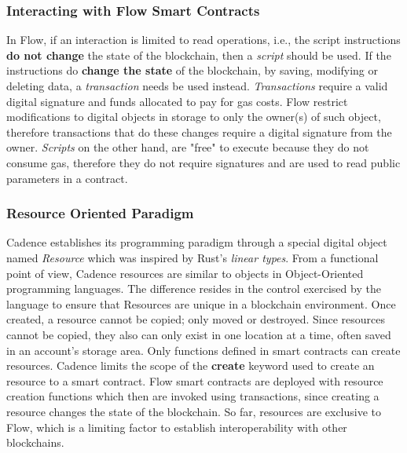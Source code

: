 \documentclass[../NFTComp_IEEE.tex]{subfiles}
\begin{document}
\subsubsection{Interacting with Flow Smart Contracts}
In Flow, if an interaction is limited to read operations, i.e., the script instructions \textbf{do not change} the state of the blockchain, then a \textit{script} should be used. If the instructions do \textbf{change the state} of the blockchain, by saving, modifying or deleting data, a \textit{transaction} needs be used instead. \textit{Transactions} require a valid digital signature and funds allocated to pay for gas costs. Flow restrict modifications to digital objects in storage to only the owner(s) of such object, therefore transactions that do these changes require a digital signature from the owner. \textit{Scripts} on the other hand, are "free" to execute because they do not consume gas, therefore they do not require signatures and are used to read public parameters in a contract.

\subsubsection{Resource Oriented Paradigm}
Cadence establishes its programming paradigm through a special digital object named \textit{Resource} which was inspired by Rust's \textit{linear types}. From a functional point of view, Cadence resources are similar to objects in Object-Oriented programming languages. The difference resides in the control exercised by the language to ensure that Resources are unique in a blockchain environment. Once created, a resource cannot be copied; only moved or destroyed. Since resources cannot be copied, they also can only exist in one location at a time, often saved in an account's storage area. Only functions defined in smart contracts can create resources. Cadence limits the scope of the \textbf{create} keyword used to create an resource to a smart contract. Flow smart contracts are deployed with resource creation functions which then are invoked using transactions, since creating a resource changes the state of the blockchain. So far, resources are exclusive to Flow, which is a limiting factor to establish interoperability with other blockchains.
\end{document}
